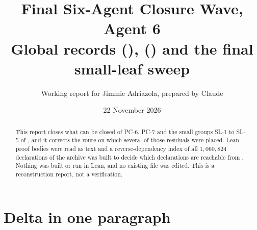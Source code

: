 \documentclass[11pt]{article}
\title{Final Six-Agent Closure Wave, Agent 6\\ Global records (\PC{6}), \FR{10} (\PC{7}) and the final small-leaf sweep}
\author{Working report for Jimmie Adriazola, prepared by Claude}
\date{22 November 2026}
\newcommand{\PC}[1]{\textsf{PC-#1}}
\newcommand{\SL}[1]{\textsf{SL-#1}}
\theoremstyle{remark}
\begin{document}
\maketitle

\begin{abstract}
This report closes what can be closed of \PC{6}, \PC{7} and the small groups \SL{1} to \SL{5} of , and it corrects the route on which several of those residuals were placed. Lean proof bodies were read as text and a reverse-dependency index of all $1{,}060{,}824$ declarations of the archive was built to decide which declarations are reachable from . Nothing was built or run in Lean, and no existing file was edited. This is a reconstruction report, not a verification.
\end{abstract}

\section*{Delta in one paragraph}
\end{document}
